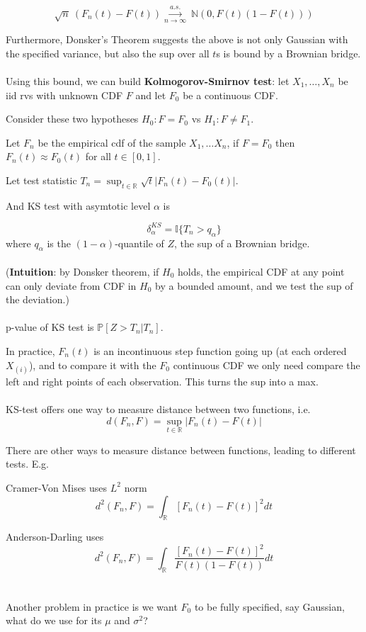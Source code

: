 \documentclass{article}
\begin{document}
$$
\sqrt{n} ~ (F_n(t) - F(t)) \overset{a.s.}{\underset{n \to \infty}{\longrightarrow}} ~ \mathbb{N}(0, F(t) (1 - F(t)))
$$

Furthermore, Donsker's Theorem suggests the above is not only Gaussian with the specified variance, but also the sup over all $t$s is bound by a Brownian bridge.
\\
\\
Using this bound, we can build \textbf{Kolmogorov-Smirnov test}: let $X_1, \dots, X_n$ be iid rvs with unknown CDF $F$ and let $F_0$ be a continuous CDF.

Consider these two hypotheses $H_0: F = F_0$ vs $H_1: F \neq F_1$.

Let $F_n$ be the empirical cdf of the sample $X_1, \dots X_n$, if $F = F_0$ then $F_n(t) \approx F_0(t)$ for all $t \in [0, 1]$.

Let test statistic $T_n = \sup_{t \in \mathbb{R}} \sqrt{t}|F_n(t) - F_0(t)|$.

And KS test with asymtotic level $\alpha$ is

$$
\delta_{\alpha}^{KS} = \mathbb{I} \{T_n > q_{\alpha}\}
$$
where $q_{\alpha}$ is the $(1-\alpha)$-quantile of $Z$, the sup of a Brownian bridge.
\\
\\
(\textbf{Intuition}: by Donsker theorem, if $H_0$ holds, the empirical CDF at any point can only deviate from CDF in $H_0$ by a bounded amount, and we test the sup of the deviation.)
\\
\\
p-value of KS test is $\mathbb{P}[Z > T_n | T_n]$.

In practice, $F_{n}(t)$ is an incontinuous step function going up (at each ordered $X_{(i)}$),
and to compare it with the $F_0$ continuous CDF we only need compare the left and right points of each observation.
This turns the sup into a max.
\\
\\
KS-test offers one way to measure distance between two functions, i.e.
$$
d(F_n, F) = \sup_{t \in \mathbb{R}} |F_n(t) - F(t)|
$$

There are other ways to measure distance between functions, leading to different tests.
E.g.

Cramer-Von Mises uses $L^2$ norm
$$
d^2(F_n, F) = \int_{\mathbb{R}} [F_n(t) - F(t)]^2 dt
$$

Anderson-Darling uses
$$
d^2(F_n, F) = \int_{\mathbb{R}} \frac{[F_n(t) - F(t)]^2}{F(t) (1 - F(t))} dt
$$
\\
\\
Another problem in practice is we want $F_0$ to be fully specified, say Gaussian, what do we use for its $\mu$ and $\sigma^2$?
\end{document}
